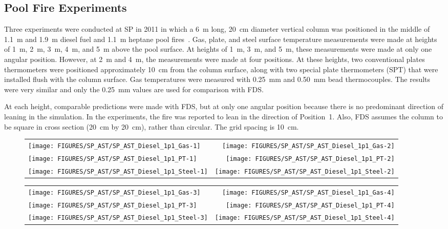 \clearpage



\subsection{Pool Fire Experiments}

Three experiments were conducted at SP in 2011 in which a 6~m long, 20~cm diameter vertical column was positioned in the middle of 1.1~m and 1.9~m diesel fuel and 1.1~m heptane
pool fires~\cite{Sjostrom:AST}. Gas, plate, and steel surface temperature measurements were made at heights of 1~m, 2~m, 3~m, 4~m, and 5~m above the pool surface. At heights of 1~m, 3~m, and 5~m, these measurements were made at only one angular position. However, at 2~m and 4~m, the measurements were made at four positions. At these heights, two conventional plates thermometers were positioned approximately 10~cm from the column surface, along with two special plate thermometers (SPT) that were installed flush with the column surface. Gas temperatures were measured with 0.25~mm and 0.50~mm bead thermocouples. The results were very similar and only the 0.25~mm values are used for comparison with FDS.

At each height, comparable predictions were made with FDS, but at only one angular position because there is no predominant direction of leaning in the simulation. In the experiments, the fire was reported to lean in the direction of Position~1. Also, FDS assumes the column to be square in cross section (20~cm by 20~cm), rather than circular. The grid spacing is 10~cm.

\begin{figure}[p]
\begin{tabular*}{\textwidth}{l@{\extracolsep{\fill}}r}
\texttt{[image: FIGURES/SP\_AST/SP\_AST\_Diesel\_1p1\_Gas-1]}   &  \texttt{[image: FIGURES/SP\_AST/SP\_AST\_Diesel\_1p1\_Gas-2]}    \\
\texttt{[image: FIGURES/SP\_AST/SP\_AST\_Diesel\_1p1\_PT-1]}    &  \texttt{[image: FIGURES/SP\_AST/SP\_AST\_Diesel\_1p1\_PT-2]}     \\
\texttt{[image: FIGURES/SP\_AST/SP\_AST\_Diesel\_1p1\_Steel-1]} &  \texttt{[image: FIGURES/SP\_AST/SP\_AST\_Diesel\_1p1\_Steel-2]}  
\end{tabular*}
\label{SP_Diesel_1p1_1m}
\end{figure}

\begin{figure}[p]
\begin{tabular*}{\textwidth}{l@{\extracolsep{\fill}}r}
\texttt{[image: FIGURES/SP\_AST/SP\_AST\_Diesel\_1p1\_Gas-3]}   &  \texttt{[image: FIGURES/SP\_AST/SP\_AST\_Diesel\_1p1\_Gas-4]}   \\
\texttt{[image: FIGURES/SP\_AST/SP\_AST\_Diesel\_1p1\_PT-3]}    &  \texttt{[image: FIGURES/SP\_AST/SP\_AST\_Diesel\_1p1\_PT-4]}    \\
\texttt{[image: FIGURES/SP\_AST/SP\_AST\_Diesel\_1p1\_Steel-3]} &  \texttt{[image: FIGURES/SP\_AST/SP\_AST\_Diesel\_1p1\_Steel-4]}
\end{tabular*}
\label{SP_Diesel_1p1_3m}
\end{figure}

